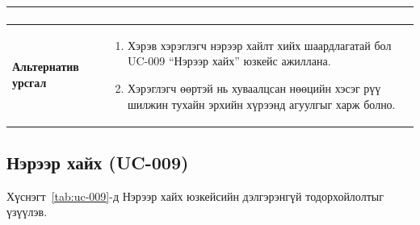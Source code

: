 \begin{table}[H]
\begin{tabular}{|p{3.8cm}|p{10.2cm}|}
\begin{enumerate}
        \end{enumerate}
        \\ \hline
        \textbf{Альтернатив урсгал} &
        \begin{enumerate}
            \item Хэрэв хэрэглэгч нэрээр хайлт хийх шаардлагатай бол UC-009 ``Нэрээр хайх'' юзкейс ажиллана.
            \item Хэрэглэгч өөртэй нь хуваалцсан нөөцийн хэсэг рүү шилжин тухайн эрхийн хүрээнд агуулгыг харж болно.
        \end{enumerate}
        \\ \hline
    \end{tabular}
\end{table}

\subsection{Нэрээр хайх (UC-009)}

Хүснэгт~\ref{tab:uc-009}-д Нэрээр хайх юзкейсийн дэлгэрэнгүй тодорхойлолтыг үзүүлэв.

